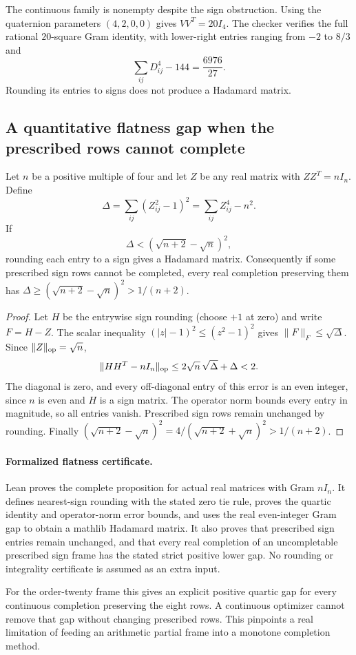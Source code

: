 The continuous family is nonempty despite the sign obstruction.
Using the quaternion parameters $(4,2,0,0)$ gives $VV^T=20I_4$.
The checker verifies the full rational $20$-square Gram identity,
with lower-right entries ranging from $-2$ to $8/3$ and
\[
                    \sum_{ij}D_{ij}^4-144=\frac{6976}{27}.
\]
Rounding its entries to signs does not produce a Hadamard matrix.

\subsection{A quantitative flatness gap when the prescribed rows cannot complete}
\begin{proposition}
\label{dil:flatness-gap}
Let $n$ be a positive multiple of four and let $Z$ be any real matrix
with $ZZ^T=nI_n$. Define
\[
 \Delta=\sum_{ij}(Z_{ij}^2-1)^2=\sum_{ij}Z_{ij}^4-n^2.
\]
If
\[
 \Delta<(\sqrt{n+2}-\sqrt n)^2,
\]
rounding each entry to a sign gives a Hadamard matrix.
Consequently if some prescribed sign rows cannot be completed,
every real completion preserving them has
$\Delta\ge(\sqrt{n+2}-\sqrt n)^2>1/(n+2)$.
\end{proposition}
\begin{proof}
Let $H$ be the entrywise sign rounding (choose $+1$ at zero)
and write $F=H-Z$. The scalar inequality
$(|z|-1)^2\le(z^2-1)^2$ gives $\|F\|_F\le\sqrt\Delta$.
Since $\|Z\|_{\rm op}=\sqrt n$,
\[
 \|HH^T-nI_n\|_{\rm op}
 \le2\sqrt n\,\sqrt\Delta+\Delta<2.
\]
The diagonal is zero, and every off-diagonal entry of this error
is an even integer, since $n$ is even and $H$ is a sign matrix.
The operator norm bounds every entry in magnitude, so all entries
vanish. Prescribed sign rows remain unchanged by rounding.
Finally
$(\sqrt{n+2}-\sqrt n)^2
=4/(\sqrt{n+2}+\sqrt n)^2>1/(n+2)$.
\end{proof}

\paragraph{Formalized flatness certificate.}
Lean proves the complete proposition for actual real matrices with
Gram $nI_n$. It defines nearest-sign rounding with the stated zero
tie rule, proves the quartic identity and operator-norm error bounds,
and uses the real even-integer Gram gap to obtain a mathlib Hadamard
matrix. It also proves that prescribed sign entries remain unchanged,
and that every real completion of an uncompletable prescribed sign
frame has the stated strict positive lower gap. No rounding or
integrality certificate is assumed as an extra input.

For the order-twenty frame this gives an explicit positive quartic
gap for every continuous completion preserving the eight rows.
A continuous optimizer cannot remove that gap without changing
prescribed rows. This pinpoints a real limitation of feeding an
arithmetic partial frame into a monotone completion method.
